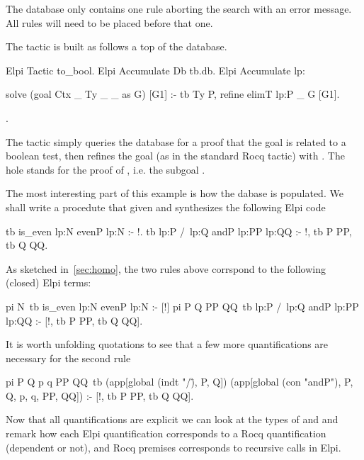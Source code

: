 \documentclass[a4paper, 11pt]{book}
\begin{document}
The database only contains one rule aborting the search with an error message.
All rules will need to be placed before that one.

The  tactic is built as follows a top of the
database.

\begin{rocqcode}
Elpi Tactic to_bool.
Elpi Accumulate Db tb.db.
Elpi Accumulate lp:{{

solve (goal Ctx _ Ty _ _ as G) [G1] :-
  tb Ty P,
  refine {{ elimT lp:P _ }} G [G1].

}}.
\end{rocqcode}

The tactic simply queries the database for a proof  that
the goal is related to a boolean test, then refines the goal (as in the
standard Rocq  tactic) with .
The hole stands for the proof of , i.e. the subgoal
.

The most interesting part of this example is how the dabase is populated.
We shall write a  procedute that given 
and  synthesizes the following Elpi code

\begin{elpicode}
tb {{ is_even lp:N }} {{ evenP lp:N }} :- !.
tb {{ lp:P /\ lp:Q }} {{ andP lp:PP lp:QQ }} :- !, tb P PP, tb Q QQ.
\end{elpicode}

As sketched in~\ref{sec:homo}, the two rules above corrspond to the
following (closed) Elpi terms:

\begin{elpicode}
pi N\ tb {{ is_even lp:N }} {{ evenP lp:N }} :- [!]
pi P Q PP QQ\ tb {{ lp:P /\ lp:Q }} {{ andP lp:PP lp:QQ }} :-
  [!, tb P PP, tb Q QQ].
\end{elpicode}

It is worth unfolding quotations to see that a few more quantifications are
necessary for the second rule

\begin{elpicode}
pi P Q p q PP QQ\
  tb (app[global (indt "/\"), P, Q])
     (app[global (con "andP"), P, Q, p, q, PP, QQ]) :-
  [!, tb P PP, tb Q QQ].
\end{elpicode}
  

Now that all quantifications are explicit we can look at the types of
\rocq{evenP} and \rocq{andP} and remark how each \elpi{pi}
Elpi quantification corresponds to a Rocq quantification (dependent or not),
and Rocq premises corresponds to recursive calls in Elpi.
\end{document}
